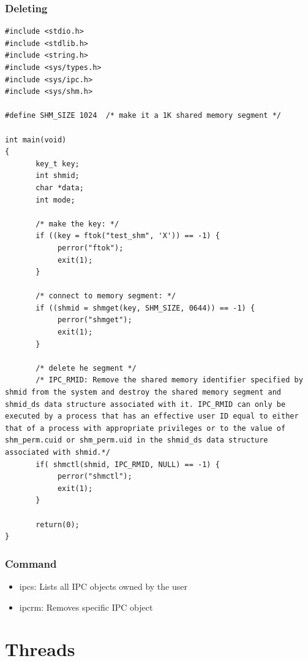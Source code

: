 \documentclass[12pt]{article}
\begin{document}
\subsubsection{Deleting}
\begin{lstlisting}
#include <stdio.h>
#include <stdlib.h>
#include <string.h>
#include <sys/types.h>
#include <sys/ipc.h>
#include <sys/shm.h>

#define SHM_SIZE 1024  /* make it a 1K shared memory segment */

int main(void)
{
       key_t key;
       int shmid;
       char *data;
       int mode;

       /* make the key: */
       if ((key = ftok("test_shm", 'X')) == -1) {
            perror("ftok");
            exit(1);
       }

       /* connect to memory segment: */
       if ((shmid = shmget(key, SHM_SIZE, 0644)) == -1) {
            perror("shmget");
            exit(1);
       }

       /* delete he segment */
       /* IPC_RMID: Remove the shared memory identifier specified by shmid from the system and destroy the shared memory segment and shmid_ds data structure associated with it. IPC_RMID can only be executed by a process that has an effective user ID equal to either that of a process with appropriate privileges or to the value of shm_perm.cuid or shm_perm.uid in the shmid_ds data structure associated with shmid.*/
       if( shmctl(shmid, IPC_RMID, NULL) == -1) {
            perror("shmctl");
            exit(1);
       }

       return(0);
}
\end{lstlisting}
\subsubsection{Command}
\begin{itemize}
    \item ipcs: Lists all IPC objects owned by the user 
    \item ipcrm: Removes specific IPC object
\end{itemize}

\section{Threads}
\end{document}
